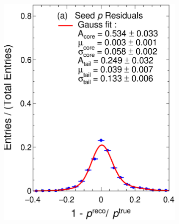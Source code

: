 \begin{figure}[t]
     \centering
     \begin{subfigure}[b]{0.48\textwidth}
         \centering
         \includegraphics[width=\textwidth]{figures/ch4-KF_NDGArLite/Toy/Corr/pRes_doublegauss.eps}
         \caption{}
         \label{fig:ToyResP_GArLite_Corr_Seed}
     \end{subfigure}
     \begin{subfigure}[b]{0.48\textwidth}
         \centering

\end{subfigure}
\end{figure}
